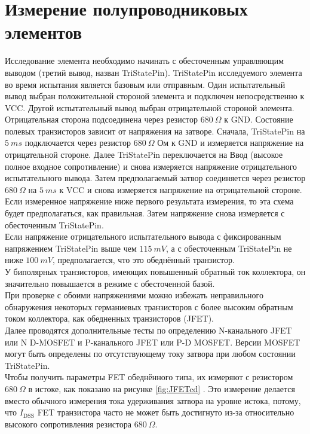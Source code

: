 \section{Измерение полупроводниковых элементов}
Исследование элемента необходимо начинать с обесточенным управляющим
выводом (третий вывод, назван TriStatePin). TriStatePin исследуемого
элемента во время испытания является  базовым или отправным. Один
испытательный вывод выбран положительной стороной элемента и
подключен непосредственно к VCC. Другой испытательный вывод выбран
отрицательной стороной элемента.
Отрицательная сторона подсоединена через резистор \(680~\Omega\) к GND.
Состояние полевых транзисторов зависит
от напряжения на затворе. Сначала, TriStatePin на \(5~ms\) подключается
через резистор \(680~\Omega\) Ом к GND и измеряется напряжение на отрицательной
стороне. Далее TriStatePin переключается на Ввод (высокое полное
входное сопротивление) и снова измеряется напряжение отрицательного
испытательного вывода. Затем предполагаемый затвор соединяется через
резистор \(680~\Omega\) на \(5~ms\) к VCC и снова измеряется напряжение на
отрицательной  стороне. Если измеренное напряжение ниже первого
результата измерения, то эта схема будет предполагаться, как
правильная. Затем напряжение снова измеряется с обесточенным TriStatePin.\\

Если напряжение отрицательного испытательного вывода с фиксированным 
напряжением TriStatePin выше чем \(115~mV\), а с обесточенным TriStatePin 
не ниже \(100~mV\), предполагается, что это обеднённый транзистор.\\

У биполярных транзисторов, имеющих повышенный обратный ток коллектора,
он значительно повышается в режиме с обесточенной базой.\\

При проверке с обоими напряжениями можно избежать неправильного
обнаружения некоторых германиевых транзисторов с более высоким
обратным током коллектора, как обедненных транзисторов (JFET).\\

Далее проводятся дополнительные тесты по определению N-канального JFET
или N D-MOSFET и P-канального JFET или P-D MOSFET. Версии MOSFET
могут быть определены по отсутствующему току затвора при любом
состоянии TriStatePin.\\

Чтобы получить параметры FET обеднённого типа, их измеряют с резистором \(680~\Omega\) в истоке, 
как показано на рисунке \ref{fig:JFETcd} . Это измерение делается вместо обычного измерения тока 
удерживания затвора на уровне истока, потому, что \(I_\mathrm{DSS}\) FET транзистора часто не может 
быть достигнуто из-за относительно высокого сопротивления резистора \(680~\Omega\).

